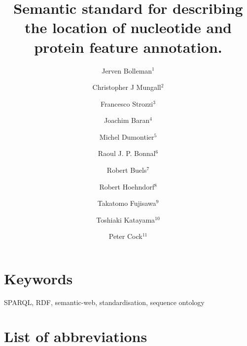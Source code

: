 \documentclass[10pt]{bmc_article}
\newenvironment{bmcformat}{\begin{raggedright}\baselineskip20pt\sloppy\setboolean{publ}{false}}{\end{raggedright}\baselineskip20pt\sloppy}
\begin{document}
\begin{bmcformat}
\title{Semantic standard for describing the location of nucleotide and protein feature annotation.}
\author{Jerven Bolleman\correspondingauthor$^1$%
    \and Christopher J Mungall$^2$%
    \and Francesco Strozzi$^3$%
    \and Joachim Baran$^4$%
    \and Michel Dumontier$^5$%
    \and Raoul J. P. Bonnal$^6$%
    \and Robert Buels$^7$%
    \and Robert Hoehndorf$^8$%
    \and Takatomo Fujisawa$^9$%
    \and Toshiaki Katayama$^10$%
    \and Peter Cock$^11$%
%
}
\address{
 \iid(1) SIB Swiss Institute of Bioinformatics, Centre Medical Universitaire, 1 rue Michel
Servet, 1211 Geneva 4, Switzerland,
 \iid(2) Genomics Division, Lawrence Berkeley National Laboratory, Berkeley, CA, 94720, US
 \iid(3) CeRSA, Parco Tecnologico Padano, Lodi 26900, Italy, and
 \iid(4) Ontario Institute for Cancer Research, 101 College Street, Suite 800, Toronto, Ontario, M5G 0A3, Canada.
 \iid(5) Stanford Center for Biomedical Informatics Research, 1265 Welch Road, Room X223, Stanford, CA, 94305-5479, US
 \iid(6) Integrative Biology Program, Istituto Nazionale Genetica Molecolare, Milan, Italy,
 \iid(7) University of California, Berkeley, Berkeley, CA, USA,
 \iid(8) Department of Computer Science, Aberystwyth, SY23 3DB, UK,
 \iid(9) Center for Information Biology, National Institute of Genetics, Research Organization of Information and Systems, 1111 Yata, Mishima, Shizuoka 411-08540, Japan,
 \iid(10) Database Center for Life Science, Research Organization of Information and Systems, 2-11-16, Yayoi, Bunkyo-ku, Tokyo, 113-0032, Japan,
 \iid(11) The James Hutton Institute, Dundee, DD2 5DA, UK,
}
\maketitle


\section*{Keywords}
SPARQL, RDF, semantic-web, standardisation, sequence ontology









\section*{List of abbreviations}


\end{bmcformat}
\end{document}

